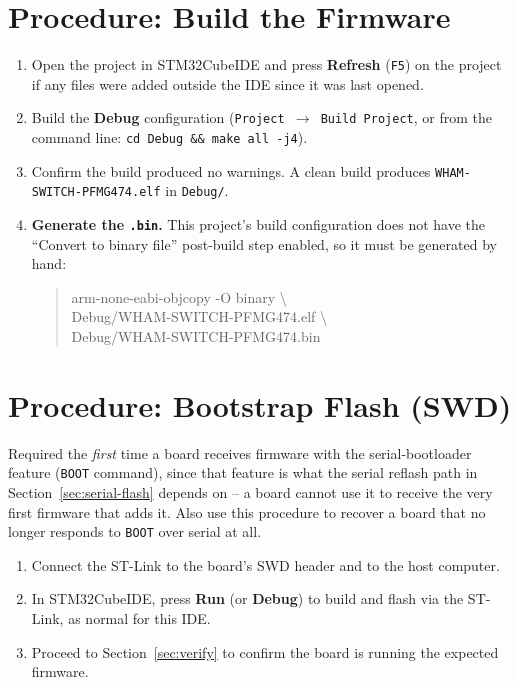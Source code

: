 \documentclass[11pt]{article}
\newcommand{\code}[1]{\texttt{#1}}
\begin{document}
\section{Procedure: Build the Firmware}
\label{sec:build}

\begin{enumerate}[label=\arabic*.]
  \item Open the project in STM32CubeIDE and press \textbf{Refresh}
    (\code{F5}) on the project if any files were added outside the IDE
    since it was last opened.
  \item Build the \textbf{Debug} configuration (\code{Project~$\to$~Build
    Project}, or from the command line: \code{cd Debug \&\& make all -j4}).
  \item Confirm the build produced no warnings. A clean build produces
    \code{WHAM-SWITCH-PFMG474.elf} in \code{Debug/}.
  \item \textbf{Generate the \code{.bin}.} This project's build
    configuration does not have the ``Convert to binary file'' post-build
    step enabled, so it must be generated by hand:
\begin{quote}\ttfamily\small\raggedright
arm-none-eabi-objcopy -O binary \textbackslash\\
\hspace*{1em}Debug/WHAM-SWITCH-PFMG474.elf \textbackslash\\
\hspace*{1em}Debug/WHAM-SWITCH-PFMG474.bin
\end{quote}
\end{enumerate}

\section{Procedure: Bootstrap Flash (SWD)}
\label{sec:bootstrap}

Required the \emph{first} time a board receives firmware with the
serial-bootloader feature (\code{BOOT} command), since that feature is
what the serial reflash path in Section~\ref{sec:serial-flash} depends
on -- a board cannot use it to receive the very first firmware that adds
it. Also use this procedure to recover a board that no longer responds
to \code{BOOT} over serial at all.

\begin{enumerate}[label=\arabic*.]
  \item Connect the ST-Link to the board's SWD header and to the host
    computer.
  \item In STM32CubeIDE, press \textbf{Run} (or \textbf{Debug}) to build
    and flash via the ST-Link, as normal for this IDE.
  \item Proceed to Section~\ref{sec:verify} to confirm the board is
    running the expected firmware.
\end{enumerate}
\end{document}
